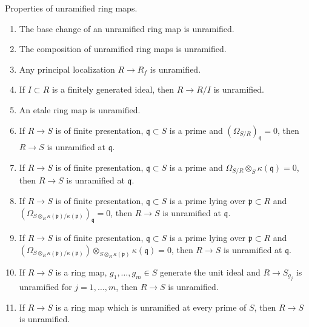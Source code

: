 \begin{lemma}
\label{lemma-unramified}
Properties of unramified ring maps.
\begin{enumerate}
\item The base change of an unramified ring map is unramified.
\item The composition of unramified ring maps is unramified.
\item Any principal localization $R \to R_f$ is unramified.
\item If $I \subset R$ is a finitely generated ideal, then
$R \to R/I$ is unramified.
\item An etale ring map is unramified.
\item If $R \to S$ is of finite presentation, $\mathfrak q \subset S$
is a prime and $(\Omega_{S/R})_{\mathfrak q} = 0$, then
$R \to S$ is unramified at $\mathfrak q$.
\item If $R \to S$ is of finite presentation, $\mathfrak q \subset S$
is a prime and $\Omega_{S/R} \otimes_S \kappa(\mathfrak q) = 0$, then
$R \to S$ is unramified at $\mathfrak q$.
\item If $R \to S$ is of finite presentation, $\mathfrak q \subset S$
is a prime lying over $\mathfrak p \subset R$ and
$(\Omega_{S \otimes_R \kappa(\mathfrak p)/\kappa(\mathfrak p)})_{\mathfrak q}
= 0$, then $R \to S$ is unramified at $\mathfrak q$.
\item If $R \to S$ is of finite presentation, $\mathfrak q \subset S$
is a prime lying over $\mathfrak p \subset R$ and
$(\Omega_{S \otimes_R \kappa(\mathfrak p)/\kappa(\mathfrak p)})
\otimes_{S \otimes_R \kappa(\mathfrak p)} \kappa(\mathfrak q) = 0$,
then $R \to S$ is unramified at $\mathfrak q$.
\item If $R \to S$ is a ring map, $g_1, \ldots, g_m \in S$ generate
the unit ideal and $R \to S_{g_j}$ is unramified for
$j = 1, \ldots, m$, then $R \to S$ is unramified.
\item If $R \to S$ is a ring map which is unramified at every prime
of $S$, then $R \to S$ is unramified.
\end{enumerate}
\end{lemma}

